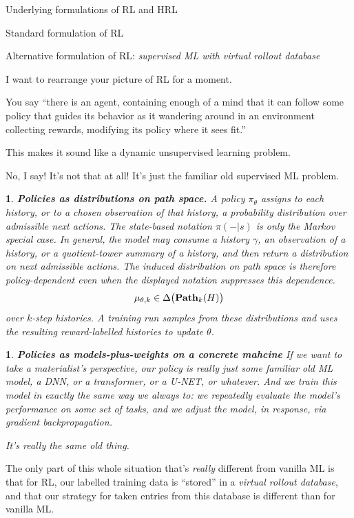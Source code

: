 \documentclass[11pt]{article}
\newtheorem{ermark}[subsubsection]{}
\begin{document}
\begin{section}{Underlying formulations of RL and HRL}
\begin{subsection}{Standard formulation of RL}
\end{subsection}

\begin{subsection}{Alternative formulation of RL: {\em supervised ML with virtual rollout database}}

I want to rearrange your picture of RL for a moment.

You say ``there is an agent, containing enough of a mind that it can follow some policy that guides its behavior as it wandering around in an environment collecting rewards, modifying its policy where it sees fit.'' 

This makes it sound like a dynamic unsupervised learning problem. 

No, I say! It's not that at all! It's just the familiar old supervised ML problem.

\begin{ermark}
{\bf Policies as distributions on path space.}
\normalfont
A policy \(\pi_\theta\) assigns to each history, or to a chosen observation of that history, a probability distribution over admissible next actions. The state-based notation $\pi(-|s)$ is only the Markov special case. In general, the model may consume a history $\gamma$, an observation of a history, or a quotient-tower summary of a history, and then return a distribution on next admissible actions. The induced distribution on path space is therefore policy-dependent even when the displayed notation suppresses this dependence.
\[
    \mu_{\theta,k}\in \Delta\big(\bold{Path}_k(H)\big)
\]
over \(k\)-step histories.  A training run samples from these distributions and uses the resulting reward-labelled histories to update \(\theta\).
\end{ermark}

\begin{ermark}
{\bf Policies as models-plus-weights on a concrete mahcine}
\normalfont
If we want to take a materialist's perspective, our policy is {\em really} just some familiar old ML model, a DNN, or a transformer, or a U-NET, or whatever.  And we train this model in exactly the same way we always to: we repeatedly evaluate the model’s performance on some set of tasks, and we adjust the model, in response, via gradient backpropagation.

It’s really the same old thing. 
\end{ermark}

The only part of this whole situation that’s {\em really} different from vanilla ML is that for RL, our labelled training data is ``stored'' in a {\em virtual rollout database}, and that our strategy for taken entries from this database is different than for vanilla ML.


\end{subsection}
\end{section}
\end{document}
